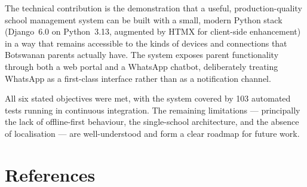 \documentclass[11pt,a4paper]{article}
\begin{document}
The technical contribution is the demonstration that a useful,
production-quality school management system can be built with a small,
modern Python stack (Django~6.0 on Python~3.13, augmented by HTMX for
client-side enhancement) in a way that remains accessible to the kinds of
devices and connections that Botswanan parents actually have. The system
exposes parent functionality through both a web portal and a WhatsApp
chatbot, deliberately treating WhatsApp as a first-class interface rather
than as a notification channel.

All six stated objectives were met, with the system covered by 103
automated tests running in continuous integration. The remaining
limitations --- principally the lack of offline-first behaviour, the
single-school architecture, and the absence of localisation --- are
well-understood and form a clear roadmap for future work.

\section*{References}
\end{document}
